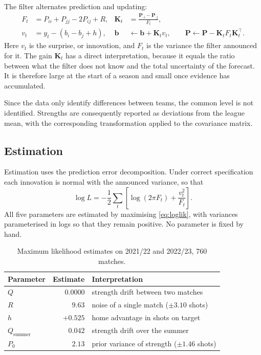 \documentclass[11pt,a4paper]{article}
\begin{document}
The filter alternates prediction and updating:
\begin{align}
F_t &= P_{ii} + P_{jj} - 2P_{ij} + R, &
\bm K_t &= \frac{\bm P_{\cdot i} - \bm P_{\cdot j}}{F_t}, \\
v_t &= y_t - (b_i - b_j + h), &
\bm b &\leftarrow \bm b + \bm K_t v_t, \qquad \bm P \leftarrow \bm P - \bm K_t F_t \bm K_t^\top .
\end{align}
Here $v_t$ is the surprise, or innovation, and $F_t$ is the variance the filter announced for it. The
gain $\bm K_t$ has a direct interpretation, because it equals the ratio between what the filter does
not know and the total uncertainty of the forecast. It is therefore large at the start of a season and
small once evidence has accumulated.

Since the data only identify differences between teams, the common level is not identified. Strengths
are consequently reported as deviations from the league mean, with the corresponding transformation
applied to the covariance matrix.

\subsection{Estimation}
Estimation uses the prediction error decomposition. Under correct specification each innovation is
normal with the announced variance, so that
\begin{equation}
\log L = -\frac{1}{2}\sum_t \left[ \log(2\pi F_t) + \frac{v_t^2}{F_t} \right].
\label{eq:loglik}
\end{equation}
All five parameters are estimated by maximising \eqref{eq:loglik}, with variances parameterised in logs
so that they remain positive. No parameter is fixed by hand.

\begin{table}[H]
\centering
\begin{tabular}{lrl}
\toprule
Parameter & Estimate & Interpretation \\
\midrule
$Q$ & $0.0000$ & strength drift between two matches \\
$R$ & $9.63$ & noise of a single match ($\pm 3.10$ shots) \\
$h$ & $+0.525$ & home advantage in shots on target \\
$Q_{\text{summer}}$ & $0.042$ & strength drift over the summer \\
$P_0$ & $2.13$ & prior variance of strength ($\pm 1.46$ shots) \\
\bottomrule
\end{tabular}
\caption{Maximum likelihood estimates on 2021/22 and 2022/23, 760 matches.}
\label{tab:params}
\end{table}
\end{document}
